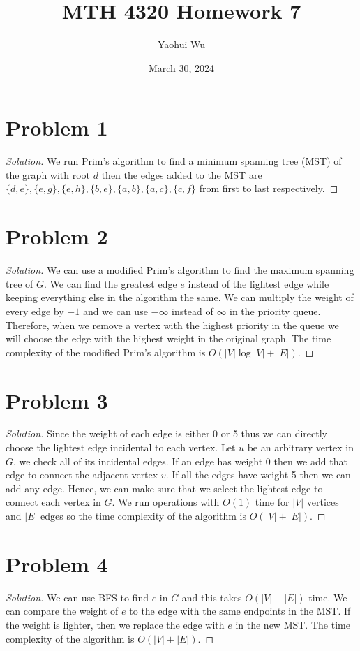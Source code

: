 \documentclass[12pt]{article}
\title{MTH 4320 Homework 7}
\author{Yaohui Wu}
\date{March 30, 2024}
\newenvironment*{solution}{\begin{proof}[Solution]}{\end{proof}}
\begin{document}
\maketitle
\section*{Problem 1}
\begin{solution}
    We run Prim's algorithm to find a minimum spanning tree (MST) of the graph
    with root \(d\) then the edges added to the MST are \(\{d,e\},\{e,g\},\{e,
    h\},\{b,e\},\{a,b\},\{a,c\},\{c,f\}\) from first to last respectively.
\end{solution}
\section*{Problem 2}
\begin{solution}
    We can use a modified Prim's algorithm to find the maximum spanning tree
    of \(G\). We can find the greatest edge \(e\) instead of the lightest edge
    while keeping everything else in the algorithm the same. We can multiply
    the weight of every edge by \(-1\) and we can use \(-\infty\) instead of
    \(\infty\) in the priority queue. Therefore, when we remove a vertex with
    the highest priority in the queue we will choose the edge with the highest
    weight in the original graph. The time complexity of the modified Prim's
    algorithm is \(O(|V|\log|V|+|E|)\).
\end{solution}
\section*{Problem 3}
\begin{solution}
    Since the weight of each edge is either 0 or 5 thus we can directly choose
    the lightest edge incidental to each vertex. Let \(u\) be an arbitrary
    vertex in \(G\), we check all of its incidental edges. If an edge has
    weight 0 then we add that edge to connect the adjacent vertex \(v\). If
    all the edges have weight 5 then we can add any edge. Hence, we can make
    sure that we select the lightest edge to connect each vertex in \(G\). We
    run operations with \(O(1)\) time for \(|V|\) vertices and \(|E|\) edges
    so the time complexity of the algorithm is \(O(|V|+|E|)\).
\end{solution}
\section*{Problem 4}
\begin{solution}
    We can use BFS to find \(e\) in \(G\) and this takes \(O(|V|+|E|)\) time.
    We can compare the weight of \(e\) to the edge with the same endpoints in
    the MST. If the weight is lighter, then we replace the edge with \(e\) in
    the new MST. The time complexity of the algorithm is \(O(|V|+|E|)\).
\end{solution}
\end{document}

